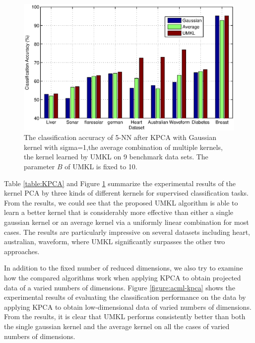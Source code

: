 \begin{figure}[!ht]\label{figure:acml-kernel-pca}
\hspace{-0.1in}
\begin{center}
\includegraphics[width= 6.5 in]{figures/acml-KernelPCA.eps}
\caption{The classification accuracy of 5-NN after KPCA with Gaussian kernel with sigma=1,the average combination of multiple kernels, the kernel learned by UMKL on 9 benchmark data sets. The parameter $B$ of UMKL is fixed to 10.}
\end{center}
\end{figure}


Table \ref{table:KPCA} and Figure \ref{figure:acml-kernel-pca} summarize the experimental results of the kernel PCA by three kinds of different kernels for supervised classification tasks. From the results, we could see that the proposed UMKL algorithm is able to learn a better kernel that is considerably more effective than either a single gaussian kernel or an average kernel via a uniformly linear combination for most cases. The results are particularly impressive on several datasets including heart, australian, waveform, where UMKL significantly surpasses the other two approaches.

In addition to the fixed number of reduced dimensions, we also try to examine how the compared algorithms work when applying KPCA to obtain projected data of a varied numbers of dimensions. Figure \ref{figure:acml-kpca} shows the experimental results of evaluating the classification performance on the data by applying KPCA to obtain low-dimensional data of varied numbers of dimensions. From the results, it is clear that UMKL performs consistently better than both the single gaussian kernel and the average kernel on all the cases of varied numbers of dimensions.

